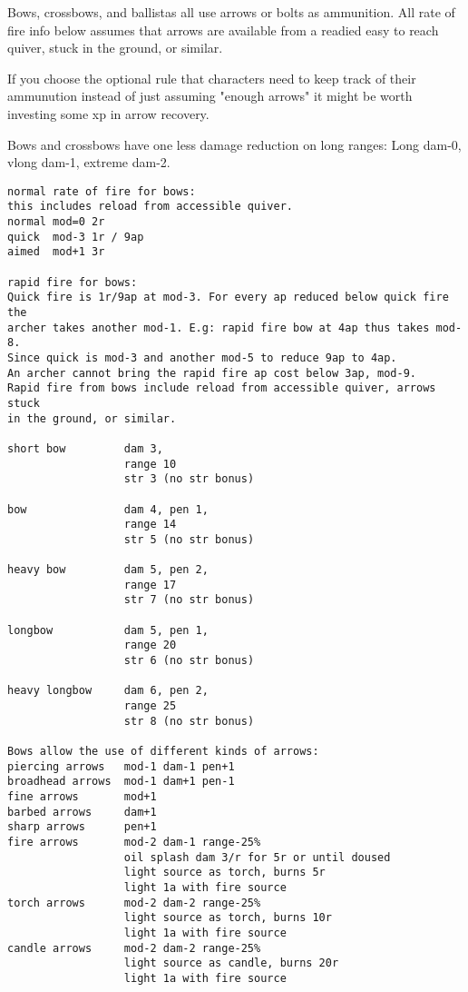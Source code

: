 Bows, crossbows, and ballistas all use arrows or bolts as ammunition. All rate of fire info below assumes that arrows are available from a readied easy to reach quiver, stuck in the ground, or similar.

If you choose the optional rule that characters need to keep track of their ammunution instead of just assuming "enough arrows" it might be worth investing some xp in arrow recovery.

Bows and crossbows have one less damage reduction on long ranges: Long dam-0, vlong dam-1, extreme dam-2.

\small \begin{verbatim}
normal rate of fire for bows:
this includes reload from accessible quiver.
normal mod=0 2r
quick  mod-3 1r / 9ap
aimed  mod+1 3r

rapid fire for bows:
Quick fire is 1r/9ap at mod-3. For every ap reduced below quick fire the
archer takes another mod-1. E.g: rapid fire bow at 4ap thus takes mod-8. 
Since quick is mod-3 and another mod-5 to reduce 9ap to 4ap.
An archer cannot bring the rapid fire ap cost below 3ap, mod-9.
Rapid fire from bows include reload from accessible quiver, arrows stuck 
in the ground, or similar.

short bow         dam 3,
                  range 10
                  str 3 (no str bonus)

bow               dam 4, pen 1,
                  range 14
                  str 5 (no str bonus)

heavy bow         dam 5, pen 2,
                  range 17
                  str 7 (no str bonus)

longbow           dam 5, pen 1,
                  range 20
                  str 6 (no str bonus)

heavy longbow     dam 6, pen 2,
                  range 25
                  str 8 (no str bonus)

Bows allow the use of different kinds of arrows:
piercing arrows   mod-1 dam-1 pen+1
broadhead arrows  mod-1 dam+1 pen-1
fine arrows       mod+1
barbed arrows     dam+1
sharp arrows      pen+1
fire arrows       mod-2 dam-1 range-25%
                  oil splash dam 3/r for 5r or until doused
                  light source as torch, burns 5r
                  light 1a with fire source
torch arrows      mod-2 dam-2 range-25%
                  light source as torch, burns 10r
                  light 1a with fire source
candle arrows     mod-2 dam-2 range-25%
                  light source as candle, burns 20r
                  light 1a with fire source



\end{verbatim}

